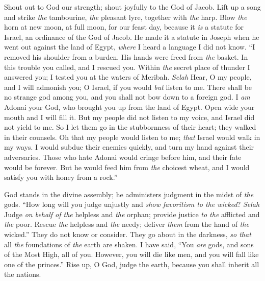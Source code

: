 \begin{biblechapter} %
 Shout out to God our strength; 
shout joyfully to the God of Jacob.
\verse Lift up a song and strike \textit{the} tambourine, 
\textit{the} pleasant lyre, together with \textit{the} harp.
\verse Blow \textit{the} horn at new moon, 
at full moon, for our feast day,
\verse because it \textit{is} a statute for Israel, 
an ordinance of the God of Jacob.
\verse He made it a statute in Joseph 
when he went out against the land of Egypt, 
\textit{where} I heard a language I did not know.
\verse “I removed his shoulder from a burden. 
His hands were freed from \textit{the} basket.
\verse In this trouble you called, and I rescued you. 
Within \textit{the} secret place of thunder I answered you; 
I tested you at the waters of Meribah. \textit{Selah}
\verse Hear, O my people, and I will admonish you; 
O Israel, if you would \textit{but} listen to me.
\verse There shall be no strange god among you, 
and you shall not bow down to a foreign god.
\verse I \textit{am} Adonai your God, 
who brought you up from the land of Egypt. 
Open wide your mouth and I will fill it.
\verse But my people did not listen to my voice, 
and Israel did not yield to me.
\verse So I let them go in the stubbornness of their heart; 
they walked in their counsels.
\verse Oh that my people would listen to me; 
\textit{that} Israel would walk in my ways.
\verse I would subdue their enemies quickly, 
and turn my hand against their adversaries.
\verse Those who hate Adonai would cringe before him, 
and their fate would be forever.
\verse But he would feed him from \textit{the} choicest wheat, 
and I would satisfy you with honey from a rock.”
\end{biblechapter}

\begin{biblechapter} %
 God stands in the divine assembly; 
he administers judgment in the midst of \textit{the} gods.
\verse “How long will you judge unjustly 
and \textit{show favoritism to the wicked}? \textit{Selah}
\verse Judge \textit{on behalf of the} helpless and \textit{the} orphan; 
provide justice \textit{to the} afflicted and \textit{the} poor.
\verse Rescue \textit{the} helpless and \textit{the} needy; 
deliver \textit{them} from the hand of \textit{the} wicked.”
\verse They do not know or consider. 
They go about in the darkness, 
\textit{so that} all \textit{the} foundations of \textit{the} earth are shaken.
\verse I have said, “You \textit{are} gods, 
and sons of the Most High, all of you.
\verse However, you will die like men, 
and you will fall like one of the princes.”
\verse Rise up, O God, judge the earth, 
because you shall inherit all the nations.
\end{biblechapter}

